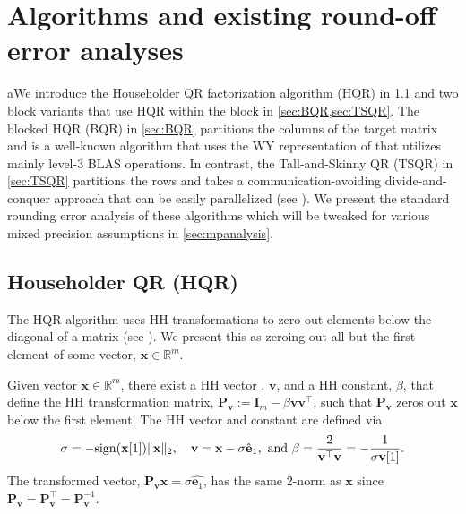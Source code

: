 \documentclass[review,onefignum,onetabnum]{siamart190516}
\newcommand{\R}{\mathbb{R}}
\newcommand{\bb}[1]{\mathbf{#1}}
\begin{document}
\section{Algorithms and existing round-off error analyses}\label{sec:algo}
%
aWe introduce the Householder QR factorization algorithm (HQR) in \cref{sec:HQR} and two block variants that use HQR within the block in \cref{sec:BQR,sec:TSQR}. 
The blocked HQR (BQR) in \cref{sec:BQR} partitions the columns of the target matrix and is a well-known algorithm that uses the WY representation of \cite{Bischof1987} that utilizes mainly level-3 BLAS operations.
In contrast, the Tall-and-Skinny QR (TSQR) in \cref{sec:TSQR} partitions the rows and takes a communication-avoiding divide-and-conquer approach that can be easily parallelized (see \cite{Demmel2007}).
We present the standard rounding error analysis of these algorithms which will be tweaked for various mixed precision assumptions in \cref{sec:mpanalysis}.
%
\subsection{Householder QR (HQR)}\label{sec:HQR}
The HQR algorithm uses HH transformations to zero out elements below the diagonal of a matrix (see \cite{Householder1958}). 
We present this as zeroing out all but the first element of some vector, $\bb{x}\in\R^m$.
\begin{lemma}
	Given vector $\bb{x}\in\R^{m}$, there exist a HH vector , $\bb{v}$, and a HH constant, $\beta$, that define the HH transformation matrix, $\bb{P}_{\bb{v}}:=\bb{I}_{m} - \beta \bb{v}\bb{v}^{\top}$, such that $\bb{P}_{\bb{v}}$ zeros out $\bb{x}$ below the first element. 
	The HH vector and constant are defined via
	\begin{equation}
	\sigma = -\rm{sign}(\bb{x}[1])\|\bb{x}\|_2, \quad  \bb{v} = \bb{x} -\sigma \hat{\bb{e}}_{1},\mbox{ and } \beta =\frac{2}{\bb{v}^{\top}\bb{v}}=-\frac{1}{\sigma\bb{v}[1]}.
	\label{eqn:HH} 
	\vspace*{-.3cm}
	\end{equation}
	The transformed vector, $\bb{P_vx}=\sigma\hat{\bb{e}_1}$, has the same 2-norm as $\bb{x}$ since $\bb{P}_{\bb{v}}=\bb{P}_{\bb{v}}^{\top}=\bb{P}_{\bb{v}}^{-1}$.
	\label{lem:hhvec}
\end{lemma}
\end{document}
